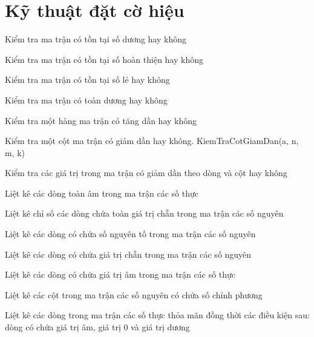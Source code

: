 \section{Kỹ thuật đặt cờ hiệu}
\begin{problem}
    Kiểm tra ma trận có tồn tại số dương hay không
\end{problem}
\begin{problem}
    Kiểm tra ma trận có tồn tại số hoàn thiện hay không
\end{problem}
\begin{problem}
    Kiểm tra ma trận có tồn tại số lẻ hay không
\end{problem}
\begin{problem}
    Kiểm tra ma trận có toàn dương hay không
\end{problem}
\begin{problem}
    Kiểm tra một hàng ma trận có tăng dần hay không
\end{problem}
\begin{problem}
    Kiểm tra một cột ma trận có giảm dần hay không. KiemTraCotGiamDan(a, n, m, k)
\end{problem}
\begin{problem}
    Kiểm tra các giá trị trong ma trận có giảm dần theo dòng và cột hay không
\end{problem}
\begin{problem}
    Liệt kê các dòng toàn âm trong ma trận các số thực
\end{problem}
\begin{problem}
    Liệt kê chỉ số các dòng chứa toàn giá trị chẵn trong ma trận các số nguyên
\end{problem}
\begin{problem}
    Liệt kê các dòng có chứa số nguyên tố trong ma trận các số nguyên
\end{problem}
\begin{problem}
    Liệt kê các dòng có chứa giá trị chẵn trong ma trận các số nguyên
\end{problem}
\begin{problem}
    Liệt kê các dòng có chứa giá trị âm trong ma trận các số thực
\end{problem}
\begin{problem}
    Liệt kê các cột trong ma trận các số nguyên có chứa số chính phương
\end{problem}
\begin{problem}
    Liệt kê các dòng trong ma trận các số thực thỏa mãn đồng thời các điều kiện sau:  dòng có chứa giá trị âm, giá trị 0 và giá trị dương
\end{problem}
